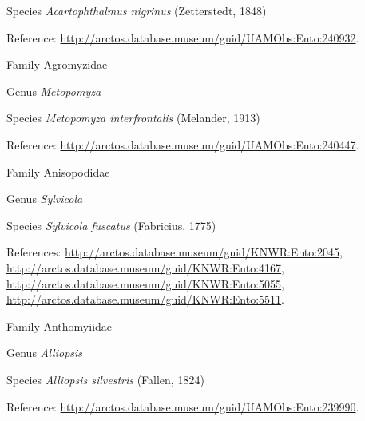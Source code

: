 \documentclass[9pt, article]{memoir}
\begin{document}
\begin{multicols}{2}
\vspace{6pt}\noindent\hspace{36pt}Species \textit{Acartophthalmus nigrinus} (Zetterstedt, 1848)


\vspace{6pt}Reference: 
\url{http://arctos.database.museum/guid/UAMObs:Ento:240932}.

\vspace{6pt}\noindent\hspace{24pt}Family Agromyzidae


\vspace{6pt}\noindent\hspace{30pt}Genus \textit{Metopomyza}


\vspace{6pt}\noindent\hspace{36pt}Species \textit{Metopomyza interfrontalis} (Melander, 1913)


\vspace{6pt}Reference: 
\url{http://arctos.database.museum/guid/UAMObs:Ento:240447}.

\vspace{6pt}\noindent\hspace{24pt}Family Anisopodidae


\vspace{6pt}\noindent\hspace{30pt}Genus \textit{Sylvicola}


\vspace{6pt}\noindent\hspace{36pt}Species \textit{Sylvicola fuscatus} (Fabricius, 1775)


\vspace{6pt}References: 
\url{http://arctos.database.museum/guid/KNWR:Ento:2045}, 
\url{http://arctos.database.museum/guid/KNWR:Ento:4167}, 
\url{http://arctos.database.museum/guid/KNWR:Ento:5055}, 
\url{http://arctos.database.museum/guid/KNWR:Ento:5511}.

\vspace{6pt}\noindent\hspace{24pt}Family Anthomyiidae


\vspace{6pt}\noindent\hspace{30pt}Genus \textit{Alliopsis}


\vspace{6pt}\noindent\hspace{36pt}Species \textit{Alliopsis silvestris} (Fallen, 1824)


\vspace{6pt}Reference: 
\url{http://arctos.database.museum/guid/UAMObs:Ento:239990}.


\end{multicols}
\end{document}
